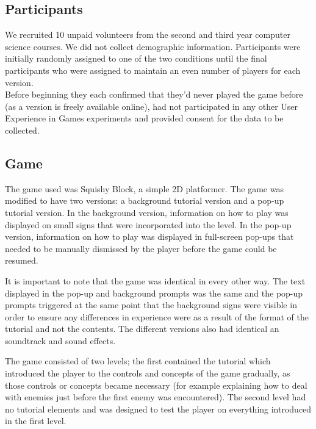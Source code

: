 \documentclass{acmsiggraph}
\begin{document}
\subsection{Participants}

We recruited 10 unpaid volunteers from the second and third year computer science courses. We did not collect demographic information. Participants were initially randomly assigned to one of the two conditions until the final participants who were assigned to maintain an even number of players for each version.\\
Before beginning they each confirmed that they'd never played the game before (as a version is freely available online)\cite{ssbb}, had not participated in any other User Experience in Games experiments and provided consent for the data to be collected.

\subsection{Game}

The game used was Squishy Block, a simple 2D platformer. 
The game was modified to have two versions: a background tutorial version and a pop-up tutorial version.
In the background version, information on how to play was displayed on small signs that were incorporated into the level. In the pop-up version, information on how to play was displayed in full-screen pop-ups that needed to be manually dismissed by the player before the game could be resumed.

It is important to note that the game was identical in every other way. The text displayed in the pop-up and background prompts was the same and the pop-up prompts triggered at the same point that the background signs were visible in order to ensure any differences in experience were as a result of the format of the tutorial and not the contents. The different versions also had identical an soundtrack and sound effects.

The game consisted of two levels; the first contained the tutorial which introduced the player to the controls and concepts of the game gradually, as those controls or concepts became necessary (for example explaining how to deal with enemies just before the first enemy was encountered). The second level had no tutorial elements and was designed to test the player on everything introduced in the first level.
\end{document}
